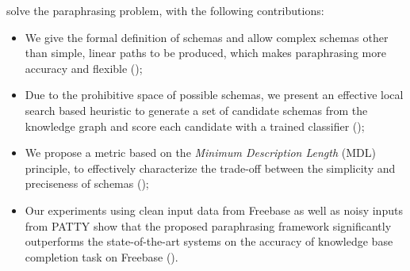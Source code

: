 solve the paraphrasing problem, with the following contributions:
\begin{itemize}
\item We give the formal definition of schemas and allow complex schemas
other than simple, linear paths to be produced, which makes paraphrasing more
accuracy and flexible (); 
\item Due to the prohibitive space of possible schemas, we present 
an effective local search based heuristic to generate a set of 
candidate schemas from the knowledge graph 
and score each candidate with a trained classifier ();
\item We propose a metric based on the \textit{Minimum Description Length}
(MDL) principle, to effectively characterize the trade-off between the simplicity
and preciseness of schemas (); 
\item Our experiments using clean input data from Freebase 
as well as noisy inputs from PATTY
show that the proposed paraphrasing framework significantly outperforms
the state-of-the-art systems on the accuracy of knowledge base completion
task on Freebase ().
\end{itemize}



